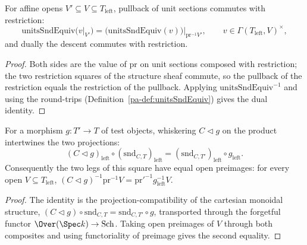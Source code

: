 \begin{lemma}
  \label{pa-lem:unitsSndEquiv_unitsRestrict}
  \leanok

  For affine opens \(V' \subseteq V \subseteq T_{\mathrm{left}}\), pullback of unit sections
  commutes with restriction:
  \[
    \mathrm{unitsSndEquiv}\bigl(v|_{V'}\bigr) = \bigl(\mathrm{unitsSndEquiv}(v)\bigr)
    \big|_{\mathrm{pr}^{-1} V'}, \qquad v \in \Gamma(T_{\mathrm{left}}, V)^{\times},
  \]
  and dually the descent commutes with restriction.
\end{lemma}
\begin{proof}
  \leanok
  Both sides are the value of \(\mathrm{pr}\) on unit sections composed with restriction; the two
  restriction squares of the structure sheaf commute, so the pullback of the restriction equals
  the restriction of the pullback.  Applying \(\mathrm{unitsSndEquiv}^{-1}\) and using the
  round-trips (Definition~\ref{pa-def:unitsSndEquiv}) gives the dual identity.
\end{proof}

\begin{lemma}
  \label{pa-lem:snd_left_naturality}
  \leanok

  For a morphism \(g \colon T' \to T\) of test objects, whiskering \(C \lhd g\) on the product
  intertwines the two projections:
  \[
    (C \lhd g)_{\mathrm{left}} \circ (\mathrm{snd}_{C,T})_{\mathrm{left}}
      = (\mathrm{snd}_{C,T'})_{\mathrm{left}} \circ g_{\mathrm{left}}.
  \]
  Consequently the two legs of this square have equal open preimages: for every open \(V
  \subseteq T_{\mathrm{left}}\), \((C \lhd g)^{-1}\mathrm{pr}^{-1} V = \mathrm{pr}'^{-1}
  g_{\mathrm{left}}^{-1} V\).
\end{lemma}
\begin{proof}
  \leanok
  The identity is the projection-compatibility of the cartesian monoidal structure,
  \((C \lhd g) \circ \mathrm{snd}_{C,T} = \mathrm{snd}_{C,T'} \circ g\), transported through the
  forgetful functor \(\Over(\Spec k) \to \mathrm{Sch}\).  Taking open preimages of \(V\) through
  both composites and using functoriality of preimage gives the second equality.
\end{proof}

